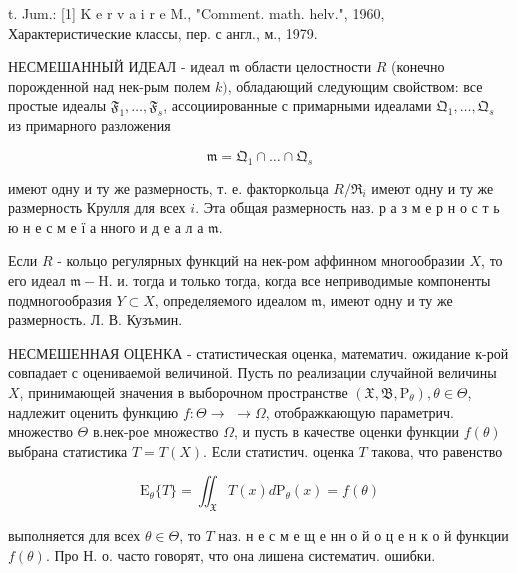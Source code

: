 \documentclass[10pt]{article}
\begin{document}
t. Jum.: [1] K e r v a i r e M., "Comment. math. helv.", 1960, Характеристические классы, пер. с англ., м., 1979.



НЕСМЕШАННЫЙ ИДЕАЛ - идеал $\mathfrak{m}$ области целостности $R$ (конечно порожденной над нек-рым полем $k)$, обладающий следующим свойством: все простые идеалы $\mathfrak{F}_{1}, \ldots, \mathfrak{F}_{s}$, ассоциированные с примарными идеалами $\mathfrak{Q}_{1}, \ldots, \mathfrak{Q}_{s}$ из примарного разложения



\[

\mathfrak{m}=\mathfrak{Q}_{1} \cap \ldots \cap \mathfrak{Q}_{s}

\]



имеют одну и ту же размерность, т. е. факторкольца $R / \Re_{i}$ имеют одну и ту же размерность Крулля для всех $i$. Эта общая размерность наз. р а з м е р н о с т ь ю н е с м е ї а нного и д е а л а $\mathfrak{m}$.



Если $R$ - кольцо регулярных функций на нек-ром аффинном многообразии $X$, то его идеал $\mathfrak{m}-\mathrm{H}$. и. тогда и только тогда, когда все неприводимые компоненты подмногообразия $Y \subset X$, определяемого идеалом $\mathfrak{m}$, имеют одну и ту же размерность. Л. В. Кузъмин.



НЕСМЕШЕННАЯ ОЦЕНКА - статистическая оценка, математич. ожидание к-рой совпадает с оцениваемой величиной. Пусть по реализации случайной величины $X$, принимающей значения в выборочном пространстве $\left(\mathfrak{X}, \mathfrak{B}, \mathrm{P}_{\theta}\right), \theta \in \Theta$, надлежит оценить функцию $f: \Theta \rightarrow$ $\rightarrow \Omega$, отображкающую параметрич. множество $\Theta$ в.нек-рое множество $\Omega$, и пусть в качестве оценки функции $f(\theta)$ выбрана статистика $T=T(X)$. Если статистич. оценка $T$ такова, что равенство



\[

\mathrm{E}_{\theta}\{T\}=\iint_{\mathfrak{X}} T(x) d \mathrm{P}_{\theta}(x)=f(\theta)

\]



выполняется для всех $\theta \in \Theta$, то $T$ наз. н е с м е щ е нн о й о ц е н к о й функции $f(\theta)$. Про Н. о. часто говорят, что она лишена систематич. ошибки.
\end{document}

